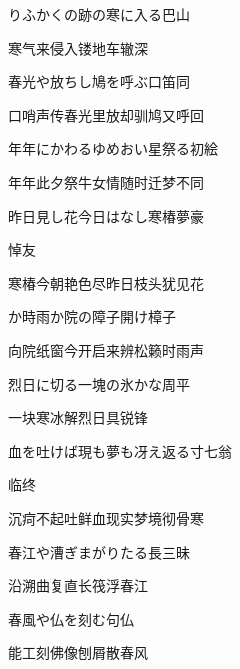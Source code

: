 \begin{haiku}
    {\FH {}りふかくの跡の寒に入る}\hfill{\FH 巴山}

    {\FK 寒气来侵入镂地车辙深}
\end{haiku}

\begin{haiku}
    {\FH 春光や放ちし鳩を呼ぶ口笛}\hfill{\FH 同}

    {\FK 口哨声传春光里放却驯鸠又呼回}
\end{haiku}

\begin{haiku}
    {\FH 年年にかわるゆめおい星祭る}\hfill{\FH 初絵}

    {\FK 年年此夕祭牛女情随时迁梦不同}
\end{haiku}

\begin{haiku}
    {\FH 昨日見し花今日はなし寒椿}\hfill{\FH 夢豪}

    {\FK 悼友}

    {\FK 寒椿今朝艳色尽昨日枝头犹见花}
\end{haiku}

\begin{haiku}
    {\FH {}か時雨か院の障子開け}\hfill{\FH 樟子}

    {\FK 向院纸窗今开启来辨松籁时雨声}
\end{haiku}

\begin{haiku}
    {\FH 烈日に切る一塊の氷かな}\hfill{\FH 周平}

    {\FK 一块寒冰解烈日具锐锋}
\end{haiku}

\begin{haiku}
    {\FH 血を吐けば現も夢も冴え返る}\hfill{\FH 寸七翁}

    {\FK 临终}

    {\FK 沉疴不起吐鲜血现实梦境彻骨寒}
\end{haiku}

\begin{haiku}
    {\FH 春江や漕ぎまがりたる長}\hfill{\FH 三昧}

    {\FK 沿溯曲复直长筏浮春江}
\end{haiku}

\begin{haiku}
    {\FH 春風や仏を刻む}\hfill{\FH 句仏}

    {\FK 能工刻佛像刨屑散春风}
\end{haiku}

